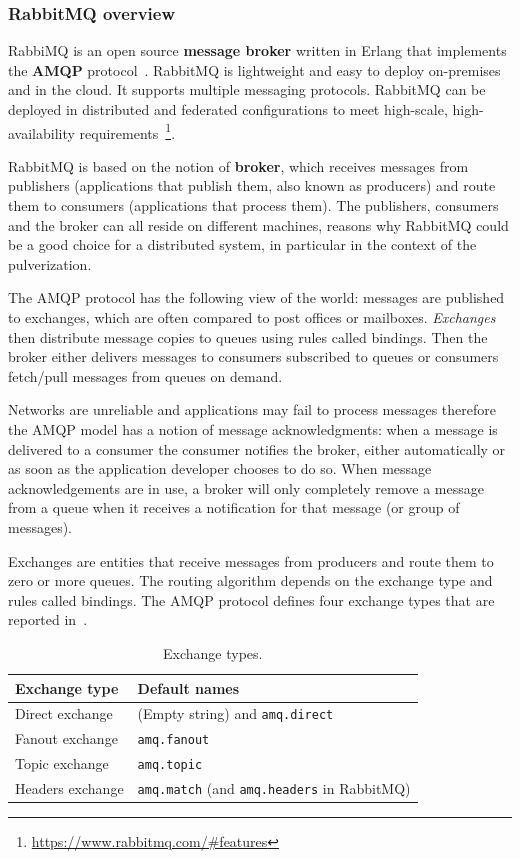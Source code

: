 \subsubsection{RabbitMQ overview}

RabbiMQ is an open source \textbf{message broker} written in Erlang that implements the \textbf{AMQP} protocol~\cite{4012603}.
RabbitMQ is lightweight and easy to deploy on-premises and in the cloud. It supports multiple messaging protocols. RabbitMQ can be deployed in
distributed and federated configurations to meet high-scale, high-availability requirements~\footnote{\url{https://www.rabbitmq.com/\#features}}.

RabbitMQ is based on the notion of \textbf{broker}, which receives messages from publishers (applications that publish them, also known as producers)
and route them to consumers (applications that process them). The publishers, consumers and the broker can all reside on different machines,
reasons why RabbitMQ could be a good choice for a distributed system, in particular in the context of the pulverization.

The AMQP protocol has the following view of the world: messages are published to exchanges, which are often compared to post offices or mailboxes.
\emph{Exchanges} then distribute message copies to queues using rules called bindings. Then the broker either delivers messages to consumers
subscribed to queues or consumers fetch/pull messages from queues on demand.

Networks are unreliable and applications may fail to process messages therefore the AMQP model has a notion of message acknowledgments: when a
message is delivered to a consumer the consumer notifies the broker, either automatically or as soon as the application developer chooses to do so.
When message acknowledgements are in use, a broker will only completely remove a message from a queue when it receives a notification for that
message (or group of messages).

Exchanges are entities that receive messages from producers and route them to zero or more queues. The routing algorithm depends on the exchange
type and rules called bindings. The AMQP protocol defines four exchange types that are reported in~.

\begin{table}[ht]
	\centering
	\begin{tabular}{l l}
		\toprule
		\textbf{Exchange type} & \textbf{Default names}                                    \\
		\midrule
		Direct exchange        & (Empty string) and \texttt{amq.direct}                    \\
		Fanout exchange        & \texttt{amq.fanout}                                       \\
		Topic exchange         & \texttt{amq.topic}                                        \\
		Headers exchange       & \texttt{amq.match} (and \texttt{amq.headers} in RabbitMQ) \\
		\bottomrule
	\end{tabular}
	\caption{Exchange types.}
	\label{tab:exchange-types}
\end{table}

